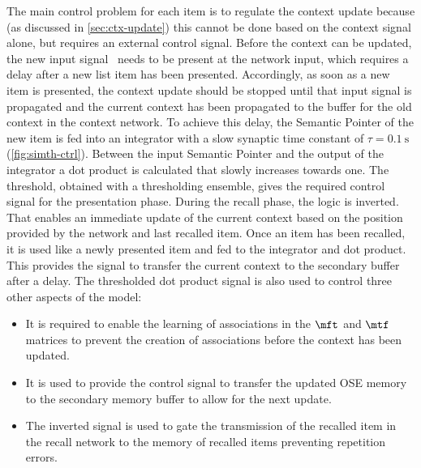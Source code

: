 The main control problem for each item is to regulate the context update because (as discussed in \cref{sec:ctx-update}) this cannot be done based on the context signal alone, but requires an external control signal.
Before the context can be updated, the new input signal \ctxin\ needs to be present at the network input, which requires a delay after a new list item has been presented.
Accordingly, as soon as a new item is presented, the context update should be stopped until that input signal is propagated and the current context has been propagated to the buffer for the old context in the context network.
To achieve this delay, the Semantic Pointer of the new item is fed into an integrator with a slow synaptic time constant of $\tau = \SI{0.1}{\second}$ (\cref{fig:simth-ctrl}).
Between the input Semantic Pointer and the output of the integrator a dot product is calculated that slowly increases towards one.
The threshold, obtained with a thresholding ensemble, gives the required control signal for the presentation phase.
During the recall phase, the logic is inverted.
That enables an immediate update of the current context based on the position provided by the  network and last recalled item.
Once an item has been recalled, it is used like a newly presented item and fed to the integrator and dot product.
This provides the signal to transfer the current context to the secondary buffer after a delay.
The thresholded dot product signal is also used to control three other aspects of the model:
\begin{itemize}
    \item It is required to enable the learning of associations in the $\mft$ and $\mtf$ matrices to prevent the creation of associations before the context has been updated.
    \item It is used to provide the control signal to transfer the updated OSE memory to the secondary memory buffer to allow for the next update.
    \item The inverted signal is used to gate the transmission of the recalled item in the recall network to the memory of recalled items preventing repetition errors.
\end{itemize}
